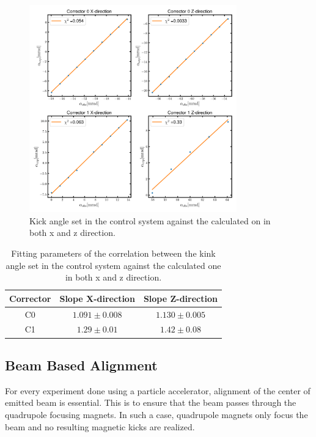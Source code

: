 \documentclass[12pt]{article}
\begin{document}
\begin{figure}[H]
    \centering
    \includegraphics[width = 0.8\textwidth]{fig/angle_by_angle_kickangle.png}
    \caption{Kick angle set in the control system against the calculated on in both x and z direction.}
    \label{angle by angle}
\end{figure}


\begin{table}[H]
    \centering
    \begin{tabular}{c|c|c}
    \hline
    \hline
        Corrector & Slope X-direction  & Slope Z-direction \\ 
        \hline
        C0 & $1.091 \pm 0.008$ & $1.130 \pm 0.005$  \\ 
        C1 & $1.29 \pm 0.01$ & $1.42 \pm 0.08$ \\ 
    \hline
    
    \end{tabular}
    
    \caption{Fitting parameters of the correlation between the kink angle set in the control system against the calculated one in both x and z direction.}
    \label{tab2}
\end{table}

\subsection{Beam Based Alignment}

For every experiment done using a particle accelerator, alignment of the center of emitted beam is essential. This is to ensure that the beam passes through the quadrupole focusing magnets. In such a case, quadrupole magnets only focus the beam and no resulting magnetic kicks are realized.  
\end{document}
